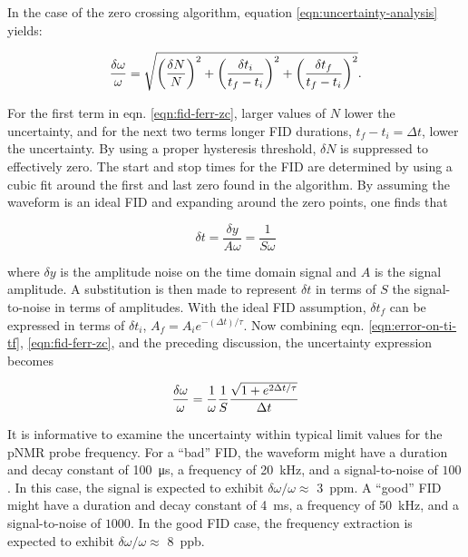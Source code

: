 \noindent
In the case of the zero crossing algorithm, equation \ref{eqn:uncertainty-analysis} yields:

\begin{equation}
\label{eqn:fid-ferr-zc}
\frac{\delta \omega}{\omega} = \\
\sqrt{
    \left( \frac{\delta N}{N} \right)^2 +
    \left( \frac{\delta t_i}{t_f - t_i} \right)^2 + 
    \left( \frac{\delta t_f}{t_f - t_i} \right)^2
    }.
\end{equation}

\noindent
For the first term in eqn. \ref{eqn:fid-ferr-zc}, larger values of $N$ lower the uncertainty, and for the next two terms longer FID durations, $t_f - t_i = \Delta t$, lower the uncertainty.  By using a proper hysteresis threshold, $\delta N$ is suppressed to effectively zero. The start and stop times for the FID are determined by using a cubic fit around the first and last zero found in the algorithm.  By assuming the waveform is an ideal FID and expanding around the zero points, one finds that 

\begin{equation}
\label{eqn:error-on-ti-tf}
\delta t = \frac{\delta y}{A \omega} = \frac{1}{S \omega}
\end{equation}

\noindent
where $\delta y$ is the amplitude noise on the time domain signal and $A$ is the signal amplitude.  A substitution is then made to represent $\delta t$ in terms of $S$ the signal-to-noise in terms of amplitudes.  With the ideal FID assumption, $\delta t_f$ can be expressed in terms of $\delta t_i$, $A_f = A_i e^{-(\Delta t) / \tau}$. Now combining eqn. \ref{eqn:error-on-ti-tf}, \ref{eqn:fid-ferr-zc}, and the preceding discussion, the uncertainty expression becomes

\begin{equation}
\label{eqn:fid-ferr-zc-2}
\frac{\delta \omega}{\omega} = \\
\frac{1}{\omega}\frac{1}{S}
\frac{\sqrt{1 + e^{2 \Delta t / \tau}}}{\Delta t}
\end{equation}

It is informative to examine the uncertainty within typical limit values for the pNMR probe frequency.  For a ``bad'' FID, the waveform might have a duration and decay constant of \SI{100}{\micro \second}, a frequency of \SI{20}{\kHz}, and a signal-to-noise of $100$.  In this case, the signal is expected to exhibit $\delta \omega / \omega \approx$ \SI{3}{ppm}.  A ``good'' FID might have a duration and decay constant of \SI{4}{\milli \second}, a frequency of \SI{50}{\kHz}, and a signal-to-noise of $1000$. In the good FID case, the frequency extraction is expected to exhibit $\delta \omega / \omega \approx$ \SI{8}{ppb}.

